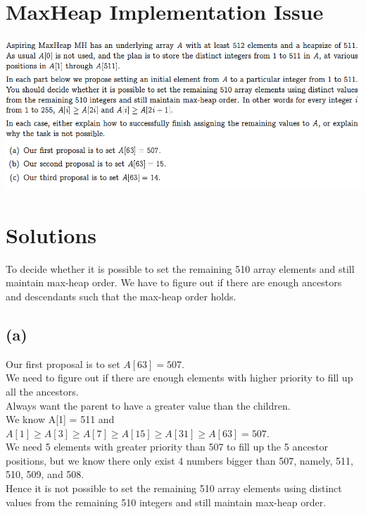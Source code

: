 \documentclass{article}
\begin{document}
\section*{MaxHeap Implementation Issue}
\includegraphics[width=\textwidth]{Heaps1}
\section*{Solutions}
To decide whether it is possible to set the  remaining 510 array elements and still maintain max-heap order. We have to figure out if there are enough ancestors and descendants such that the max-heap order holds. 


\subsection*{(a)}
Our first proposal is to set $A[63] = 507$.\\
We need to figure out if there are enough elements with higher priority to fill up all the ancestors. \\
Always want the parent to have a greater value than the children. \\
We know A[1] = 511 and $A[1] \geq A[3] \geq A[7] \geq A[15] \geq A[31] \geq A[63] = 507$.\\
We need 5 elements with greater priority than 507 to fill up the 5 ancestor positions, but we know there only exist 4 numbers bigger than 507, namely, 511, 510, 509, and 508. \\
Hence it is not possible to set the remaining 510 array elements using distinct values
from the remaining 510 integers and still maintain max-heap order.
\end{document}
